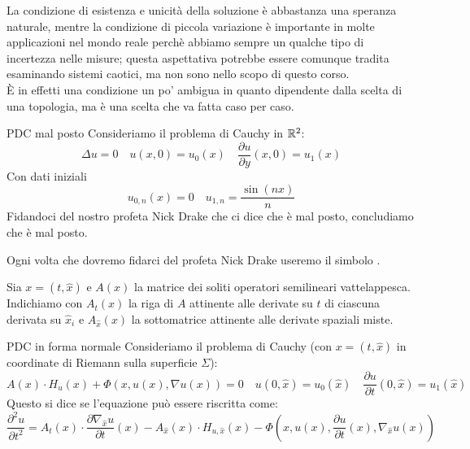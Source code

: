 \documentclass{book}
\begin{document}
\begin{remark}{}{}
    La condizione di esistenza e unicità della soluzione è abbastanza una speranza naturale, mentre la condizione di piccola variazione è importante in molte applicazioni nel mondo reale perchè abbiamo sempre un qualche tipo di incertezza nelle misure; questa aspettativa potrebbe essere comunque tradita esaminando sistemi caotici, ma non sono nello scopo di questo corso.\\
    È in effetti una condizione un po' ambigua in quanto dipendente dalla scelta di una topologia, ma è una scelta che va fatta caso per caso.
\end{remark}

\begin{example}{PDC mal posto}{}
    Consideriamo il problema di Cauchy in $\mathbb{R}^2$:
    \[\Delta u = 0 \quad u(x,0) = u_0(x) \quad \frac{\partial u}{\partial y}(x,0) = u_1(x)\]    
    Con dati iniziali
    \[u_{0,n}(x) = 0 \quad u_{1,n} = \frac{\sin(nx)}{n} \]
    Fidandoci del nostro profeta Nick Drake che ci dice che è mal posto, concludiamo che è mal posto.
\end{example}

\begin{notation}
    Ogni volta che dovremo fidarci del profeta Nick Drake useremo il simbolo \Nick.
\end{notation}

\begin{notation}
    Sia $x = (t,\hat{x})$ e $A(x)$ la matrice dei soliti operatori semilineari vattelappesca.\\
    Indichiamo con $A_t(x)$ la riga di $A$ attinente alle derivate su $t$ di ciascuna derivata su $\hat{x}_i$ e $A_{\hat{x}}(x)$ la sottomatrice attinente alle derivate spaziali miste.
\end{notation}

\begin{definition}{PDC in forma normale}{}
    Consideriamo il problema di Cauchy (con $x = (t,\hat{x})$ in coordinate di Riemann sulla superficie $\Sigma$):
    \[A(x)\cdot H_u(x) + \Phi(x, u(x), \nabla u(x)) = 0 \quad u(0,\hat{x}) = u_0(\hat{x}) \quad \frac{\partial u}{\partial t}(0,\hat{x}) = u_1(\hat{x})\]
    Questo si dice  se l'equazione può essere riscritta come:
    \[\frac{\partial^2 u}{\partial t^2} = A_t(x) \cdot \frac{\partial \nabla_{\hat{x}} u }{\partial t}(x) - A_{\hat{x}}(x) \cdot H_{u,\hat{x}}(x) - \Phi\left(x,u(x),\frac{\partial u}{\partial t}(x), \nabla_{\hat{x}} u(x) \right)\]
\end{definition}
\end{document}
